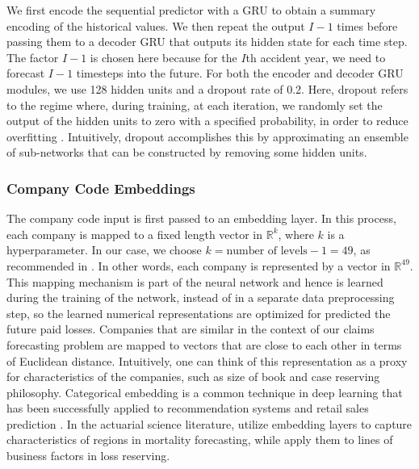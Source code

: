 \documentclass[risks,article,submit,moreauthors,pdftex]{mdpi}
\begin{document}
We first encode the sequential predictor with a GRU to obtain a summary encoding of the historical values. We then repeat the output \(I-1\) times before passing them to a decoder GRU that outputs its hidden state for each time step. The factor \(I-1\) is chosen here because for the \(I\)th accident year, we need to forecast \(I-1\) timesteps into the future. For both the encoder and decoder GRU modules, we use 128 hidden units and a dropout rate of 0.2. Here, dropout refers to the regime where, during training, at each iteration, we randomly set the output of the hidden units to zero with a specified probability, in order to reduce overfitting \citep{srivastava2014dropout}. Intuitively, dropout accomplishes this by approximating an ensemble of sub-networks that can be constructed by removing some hidden units.

\hypertarget{company-code-embeddings}{%
\subsubsection{Company Code Embeddings}\label{company-code-embeddings}}

The company code input is first passed to an embedding layer. In this process, each company is mapped to a fixed length vector in \(\mathbb{R}^k\), where \(k\) is a hyperparameter. In our case, we choose \(k = \text{number of levels} - 1 = 49\), as recommended in \citet{DBLP:journals/corr/GuoB16}. In other words, each company is represented by a vector in \(\mathbb{R}^{49}\). This mapping mechanism is part of the neural network and hence is learned during the training of the network, instead of in a separate data preprocessing step, so the learned numerical representations are optimized for predicted the future paid losses. Companies that are similar in the context of our claims forecasting problem are mapped to vectors that are close to each other in terms of Euclidean distance. Intuitively, one can think of this representation as a proxy for characteristics of the companies, such as size of book and case reserving philosophy. Categorical embedding is a common technique in deep learning that has been successfully applied to recommendation systems \citep{Cheng_2016} and retail sales prediction \citep{DBLP:journals/corr/GuoB16}. In the actuarial science literature, \citet{richman2018neural} utilize embedding layers to capture characteristics of regions in mortality forecasting, while \citet{gabrielli2018neural} apply them to lines of business factors in loss reserving.
\end{document}

